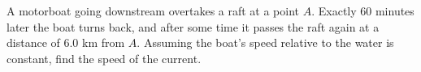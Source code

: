 A motorboat going downstream overtakes a raft at a point $A$. Exactly $60$ minutes later the boat turns back, and after some time it passes the raft again at a distance of $6.0$ km from $A$. Assuming the boat's speed relative to the water is constant, find the speed of the current.
